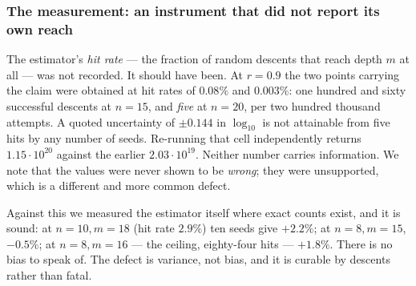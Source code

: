 \documentclass[11pt,a4paper]{article}
\begin{document}
\subsubsection*{The measurement: an instrument that did not report its own reach}
The estimator's \emph{hit rate} --- the fraction of random descents that reach depth $m$ at all
--- was not recorded.  It should have been.  At $r=0.9$ the two points carrying the claim were
obtained at hit rates of $0.08\%$ and $0.003\%$: one hundred and sixty successful descents at
$n=15$, and \emph{five} at $n=20$, per two hundred thousand attempts.  A quoted uncertainty of
$\pm0.144$ in $\log_{10}$ is not attainable from five hits by any number of seeds.  Re-running
that cell independently returns $1.15\cdot10^{20}$ against the earlier $2.03\cdot10^{19}$.
Neither number carries information.  We note that the values were never shown to be
\emph{wrong}; they were unsupported, which is a different and more common defect.

Against this we measured the estimator itself where exact counts exist, and it is sound:
at $n{=}10,m{=}18$ (hit rate $2.9\%$) ten seeds give $+2.2\%$; at $n{=}8,m{=}15$, $-0.5\%$; at
$n{=}8,m{=}16$ --- the ceiling, eighty-four hits --- $+1.8\%$.  There is no bias to speak of.
The defect is variance, not bias, and it is curable by descents rather than fatal.
\end{document}

